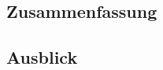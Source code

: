 \subsection{Zusammenfassung} \label{zusammenfassung}

%
%
%
%
%


\subsection{Ausblick} \label{ausblick}



